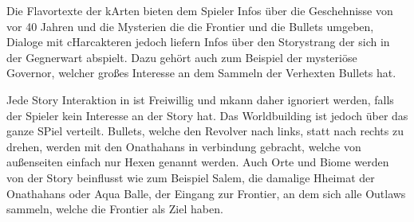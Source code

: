 Die Flavortexte der kArten bieten dem Spieler Infos über die Geschehnisse von vor 40 Jahren und die Mysterien die die
Frontier und die Bullets umgeben, Dialoge mit cHarcakteren jedoch liefern Infos über den Storystrang der sich in der Gegnerwart abspielt.
Dazu gehört auch zum Beispiel der mysteriöse Governor, welcher großes Interesse an dem Sammeln der Verhexten Bullets hat.


Jede Story Interaktion in \FF ist Freiwillig und mkann daher ignoriert werden, falls der Spieler kein Interesse an der Story hat.
Das Worldbuilding ist jedoch über das ganze SPiel verteilt. Bullets, welche den Revolver nach links, statt nach rechts zu drehen,
werden mit den Onathahans in verbindung gebracht, welche von außenseiten einfach nur Hexen genannt werden.
Auch Orte und Biome werden von der Story beinflusst wie zum Beispiel Salem, die damalige Hheimat der Onathahans oder Aqua Balle,
der Eingang zur Frontier, an dem sich alle Outlaws sammeln, welche die Frontier als Ziel haben.


\renewcommand{\kapitelautor}{}
